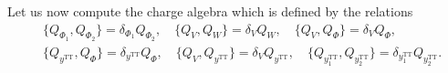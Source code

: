 \documentclass[a4paper,12pt]{article}
\begin{document}

Let us now compute the charge algebra which is  defined by the relations 
\begin{equation}
\begin{aligned}
   & \{Q_{\Phi_1}, Q_{\Phi_2}\}= \delta_{\Phi_1} Q_{\Phi_2}, \quad \{Q_{V}, Q_{W}\} = \delta_{V} Q_{W}, \quad \{Q_{V}, Q_{\Phi}\} = \delta_{V} Q_{\Phi}, \\
   &\{Q_{y^\text{TT}}, Q_{\Phi}\}= \delta_{y^\text{TT}} Q_{\Phi}, \quad \{Q_{V}, Q_{y^\text{TT}}\} = \delta_{V} Q_{y^\text{TT}}, \quad \{Q_{y_1^\text{TT}}, Q_{y_2^\text{TT}}\} = \delta_{y_1^\text{TT}} Q_{y_2^\text{TT}}.
\end{aligned}
\end{equation}
\end{document}

